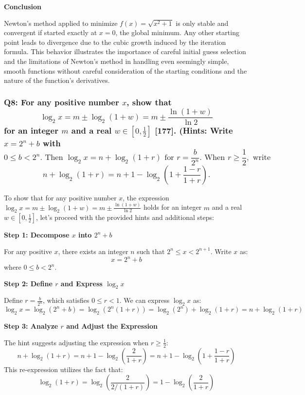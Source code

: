 \documentclass[8pt]{article}
\begin{document}
\textbf{Conclusion}

Newton’s method applied to minimize \(f(x) = \sqrt{x^2 + 1}\) is only stable and convergent if started exactly at \(x = 0\), the global minimum. Any other starting point leads to divergence due to the cubic growth induced by the iteration formula. This behavior illustrates the importance of careful initial guess selection and the limitations of Newton's method in handling even seemingly simple, smooth functions without careful consideration of the starting conditions and the nature of the function's derivatives.

\subsubsection*{Q8: For any positive number \(x\), show that
\[ \log_2 x = m \pm \log_2 (1 + w) = m \pm \frac{\ln(1 + w)}{\ln 2} \]
for an integer \(m\) and a real \(w \in \left[0, \frac{1}{2}\right]\) [177]. (Hints: Write \(x = 2^n + b\) with
\[ 0 \leq b < 2^n. \text{ Then } \log_2 x = n + \log_2 (1 + r) \text{ for } r = \frac{b}{2^n}. \text{ When } r \geq \frac{1}{2}, \text{ write } \]
\[ n + \log_2 (1 + r) = n + 1 - \log_2 \left(1 + \frac{1 - r}{1 + r}\right). \]}

To show that for any positive number \(x\), the expression \(\log_2 x = m \pm \log_2 (1 + w) = m \pm \frac{\ln(1 + w)}{\ln 2}\) holds for an integer \(m\) and a real \(w \in \left[0, \frac{1}{2}\right]\), let's proceed with the provided hints and additional steps:

\textbf{Step 1: Decompose \(x\) into \(2^n + b\)}

For any positive \(x\), there exists an integer \(n\) such that \(2^n \leq x < 2^{n+1}\). Write \(x\) as:
\[ x = 2^n + b \]
where \(0 \leq b < 2^n\). 

\textbf{Step 2: Define \(r\) and Express \(\log_2 x\)}

Define \(r = \frac{b}{2^n}\), which satisfies \(0 \leq r < 1\). We can express \(\log_2 x\) as:
\[ \log_2 x = \log_2 (2^n + b) = \log_2 (2^n(1 + r)) = \log_2 (2^n) + \log_2 (1 + r) = n + \log_2 (1 + r) \]

\textbf{Step 3: Analyze \(r\) and Adjust the Expression}

The hint suggests adjusting the expression when \(r \geq \frac{1}{2}\):
\[ n + \log_2 (1 + r) = n + 1 - \log_2 \left(\frac{2}{1 + r}\right) = n + 1 - \log_2 \left(1 + \frac{1 - r}{1 + r}\right) \]
This re-expression utilizes the fact that:
\[ \log_2 (1 + r) = \log_2 \left(\frac{2}{2/(1 + r)}\right) = 1 - \log_2 \left(\frac{2}{1 + r}\right) \]
\end{document}
